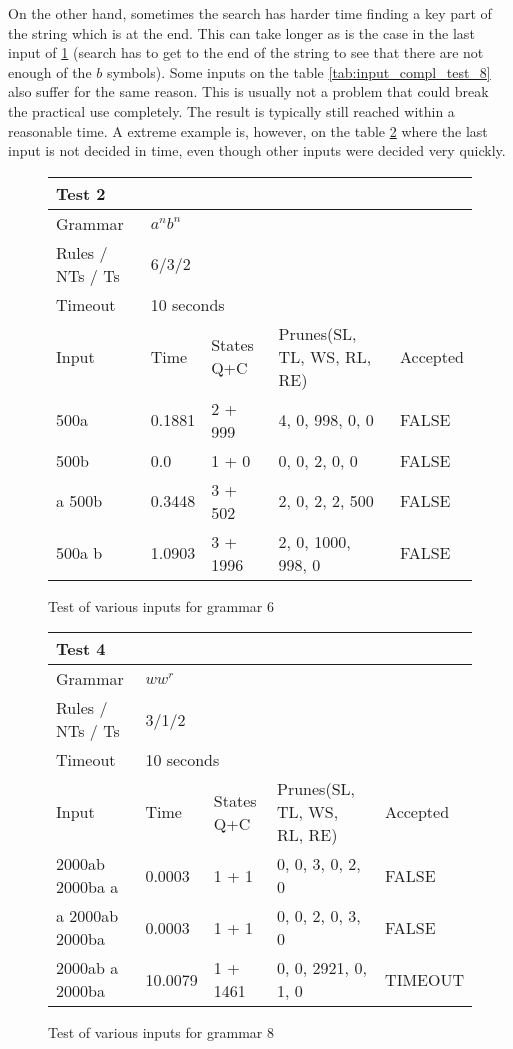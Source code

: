 On the other hand, sometimes the search has harder time finding a key part of the string which is at the end. This can take longer as is the case in the last input of \ref{tab:input_compl_test_2} (search has to get to the end of the string to see that there are not enough of the $b$ symbols). Some inputs on the table \ref{tab:input_compl_test_8} also suffer for the same reason. This is usually not a problem that could break the practical use completely. The result is typically still reached within a reasonable time. A extreme example is, however, on the table \ref{tab:input_compl_test_4} where the last input is not decided in time, even though other inputs were decided very quickly.

\begin{figure}[h]
\centering
  \caption{Test of various inputs for grammar 6}
  \label{tab:input_compl_test_2}
\begin{tabular}{ |l|l|l|l|l|  }
  \hline
  \multicolumn{5}{|l|}{Test 2} \\
  \hline
  Grammar & \multicolumn{4}{|l|}{$a^n b^n$} \\
  Rules / NTs / Ts & \multicolumn{4}{|l|}{6/3/2} \\
  Timeout & \multicolumn{4}{|l|}{10 seconds} \\
  \hline
  Input & Time & States Q+C & Prunes(SL, TL, WS, RL, RE) & Accepted \\
  \hline
  500a & 0.1881 & 2 + 999 & 4, 0, 998, 0, 0 & FALSE \\
  500b & 0.0 & 1 + 0 & 0, 0, 2, 0, 0 & FALSE \\
  a 500b & 0.3448 & 3 + 502 & 2, 0, 2, 2, 500 & FALSE \\
  500a b & 1.0903 & 3 + 1996 & 2, 0, 1000, 998, 0  & FALSE \\
  \hline
\end{tabular}
\end{figure}


\begin{figure}[h]
\centering
  \caption{Test of various inputs for grammar 8}
  \label{tab:input_compl_test_4}
\begin{tabular}{ |l|l|l|l|l|  }
  \hline
  \multicolumn{5}{|l|}{Test 4} \\
  \hline
  Grammar & \multicolumn{4}{|l|}{$w w^r$} \\
  Rules / NTs / Ts & \multicolumn{4}{|l|}{3/1/2} \\
  Timeout & \multicolumn{4}{|l|}{10 seconds} \\
  \hline
  Input & Time & States Q+C & Prunes(SL, TL, WS, RL, RE) & Accepted \\
  \hline
  2000ab 2000ba a & 0.0003 & 1 + 1 & 0, 0, 3, 0, 2, 0 & FALSE \\
  a 2000ab 2000ba &  0.0003 & 1 + 1 & 0, 0, 2, 0, 3, 0 & FALSE \\
  2000ab a 2000ba & 10.0079 & 1 + 1461 & 0, 0, 2921, 0, 1, 0 & TIMEOUT \\
  \hline
\end{tabular}
\end{figure}

